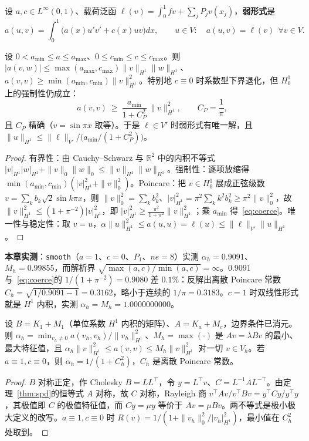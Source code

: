 设 $a,c\in L^\infty(0,1)$、载荷泛函 $\ell(v)=\int_0^1fv+\sum_jP_jv(x_j)$，\textbf{弱形式}是
\begin{equation}
  a(u,v)=\int_0^1\bigl(a(x)u'v'+c(x)uv\bigr)dx,\qquad u\in V:\quad a(u,v)=\ell(v)\ \ \forall
  v\in V .
  \label{eq:weak}
\end{equation}

\begin{theorem}[有界性与强制性]
\label{thm:laxmilgram}
设 $0<a_{\min}\le a\le a_{\max}$、$0\le c_{\min}\le c\le c_{\max}$。则
$|a(v,w)|\le\max(a_{\max},c_{\max})\|v\|_{H^1}\|w\|_{H^1}$、$a(v,v)\ge\min(a_{\min},c_{\min})\|v\|_{H^1}^2$。特别地
$c\equiv0$ 时系数型下界退化，但 $H^1_0$ 上的强制性仍成立：
\begin{equation}
  a(v,v)\ \ge\ \frac{a_{\min}}{1+C_P^2}\,\|v\|_{H^1}^2,\qquad C_P=\frac1\pi ,
  \label{eq:coerce}
\end{equation}
且 $C_P$ 精确（$v=\sin\pi x$ 取等）。于是 $\ell\in V'$ 时弱形式有唯一解，且
$\|u\|_{H^1}\le\|\ell\|_{V'}\big/\bigl(a_{\min}/(1+C_P^2)\bigr)$。
\end{theorem}
\begin{proof}
有界性：由 Cauchy--Schwarz 与 $\mathbb R^2$ 中的内积不等式
$|v|_{H^1}|w|_{H^1}+\|v\|_0\|w\|_0\le\|v\|_{H^1}\|w\|_{H^1}$。强制性：逐项放缩得
$\min(a_{\min},c_{\min})(|v|_{H^1}^2+\|v\|_0^2)$。Poincare：把 $v\in H^1_0$ 展成正弦级数
$v=\sum_kb_k\sqrt2\sin k\pi x$，则
$\|v\|_0^2=\sum_kb_k^2$、$|v|_{H^1}^2=\pi^2\sum_kk^2b_k^2\ge\pi^2\|v\|_0^2$，故
$\|v\|_{H^1}^2\le(1+\pi^{-2})|v|_{H^1}^2$，即 $|v|_{H^1}^2\ge\frac{\pi^2}{1+\pi^2}\|v\|_{H^1}^2$；乘
$a_{\min}$ 得~\eqref{eq:coerce}。唯一性与稳定性：取 $v=u$，$\alpha\|u\|_{H^1}^2\le
a(u,u)=\ell(u)\le\|\ell\|_{V'}\|u\|_{H^1}$。
\end{proof}

\textbf{本章实测}：\texttt{smooth}（$a=1$、$c=0$、$P_1$、$ne=8$）实测 $\alpha_h=0.9091$、$M_h=0.99855$，而解析界
$\sqrt{\max(a,c)/\min(a,c)}=\infty$。$0.9091$ 与~\eqref{eq:coerce}的 $1/(1+\pi^{-2})=0.9080$ 差
$0.1\%$：反解出离散 Poincare 常数 $C_h=\sqrt{1/0.9091-1}=0.3162$，略小于连续的 $1/\pi=0.3183$。$c=1$ 时双线性形式就是
$H^1$ 内积，实测 $\alpha_h=M_h=1.0000000000$。

\begin{theorem}[离散常数就是一对广义特征值]
\label{thm:discrete}
设 $B=K_1+M_1$（单位系数 $H^1$ 内积的矩阵）、$A=K_a+M_c$，边界条件已消元。则
$\alpha_h=\min_{v_h\ne0}a(v_h,v_h)/\|v_h\|_{H^1}^2$、$M_h=\max(\cdot)$ 是 $Av=\lambda Bv$
的最小、最大特征值，且 $\alpha_h\|v\|_{H^1}^2\le a(v,v)\le M_h\|v\|_{H^1}^2$ 对一切 $v\in V_h$。若
$a\equiv1,c\equiv0$，则 $\alpha_h=1/(1+C_h^2)$，$C_h$ 是离散 Poincare 常数。
\end{theorem}
\begin{proof}
$B$ 对称正定，作 Cholesky $B=LL^{\top}$，令 $y=L^{\top}v$、$C=L^{-1}AL^{-\top}$。由定理~\ref{thm:spd}的恒等式 $A$
对称，故 $C$ 对称，Rayleigh 商 $v^{\top}Av/v^{\top}Bv=y^{\top}Cy/y^{\top}y$，其极值即 $C$ 的极值特征值，而 $Cy=\mu y$
等价于 $Av=\mu Bv$。两不等式是极小极大定义的改写。$a\equiv1,c\equiv0$ 时 $R(v)=1/(1+\|v_h\|_0^2/|v_h|_{H^1}^2)$，最小值在
$C_h^2$ 处取到。
\end{proof}


